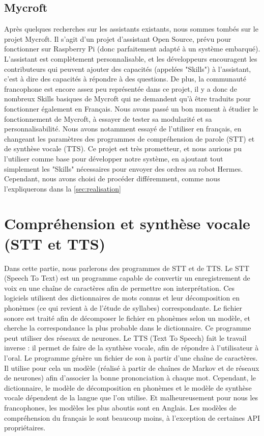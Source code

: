 \documentclass[a4paper,10pt]{report}
\begin{document}
      \subsection{Mycroft}
      {Après quelques recherches sur les assistants existants, nous sommes tombés sur le projet Mycroft. Il s'agit d'un projet d'assistant
          Open Source, prévu pour fonctionner sur Raspberry Pi (donc parfaitement adapté à un système embarqué). L'assistant est complètement
          personnalisable, et les développeurs encouragent les contributeurs qui peuvent ajouter des capacités (appelées "Skills") à l'assistant,
          c'est à dire des capacités à répondre à des questions. De plus, la communauté francophone est encore assez peu représentée dans ce projet,
          il y a donc de nombreux Skills basiques de Mycroft qui ne demandent qu'à être traduits pour fonctionner également en Français.}
      {Nous avons passé un bon moment à étudier le fonctionnement de Mycroft, à essayer de tester sa modularité et sa personnalisabilité.
          Nous avons notamment essayé de l'utiliser en français, en changeant les paramètres des programmes de compréhension de parole (STT)
          et de synthèse vocale (TTS).}
      {Ce projet est très prometteur, et nous aurions pu l'utiliser comme base pour développer notre système, en ajoutant tout simplement les
          "Skills" nécessaires pour envoyer des ordres au robot Hermes. Cependant, nous avons choisi de procéder différemment, comme nous
          l'expliquerons dans la \autoref{sec:realisation}}
    \section{Compréhension et synthèse vocale (STT et TTS)}
    {Dans cette partie, nous parlerons des programmes de STT et de TTS.}
    {Le STT (Speech To Text) est un programme capable de convertir un enregistrement de voix en une chaîne de caractères afin de permettre
        son interprétation. Ces logiciels utilisent des dictionnaires de mots connus et leur décomposition en phonèmes (ce qui revient à de l'étude de syllabes)
        correspondante. Le fichier sonore est traité afin de décomposer le fichier en phonèmes selon un modèle, et cherche la correspondance la plus probable dans le
        dictionnaire. Ce programme peut utiliser des réseaux de neurones.}
    {Le TTS (Text To Speech) fait le travail inverse : il permet de faire de la synthèse vocale, afin de répondre à l'utilisateur à l'oral.
        Le programme génère un fichier de son à partir d'une chaîne de caractères. Il utilise pour cela un modèle (réalisé à partir de chaînes de
        Markov et de réseaux de neurones) afin d'associer la bonne prononciation à chaque mot.}
    {\newline Cependant, le dictionnaire, le modèle de décomposition en phonèmes et le modèle de synthèse vocale dépendent de la langue que l'on utilise.
        Et malheureusement pour nous les francophones, les modèles les plus aboutis sont en Anglais. Les modèles de compréhension du français le sont beaucoup
        moins, à l'exception de certaines API propriétaires.}
\end{document}
